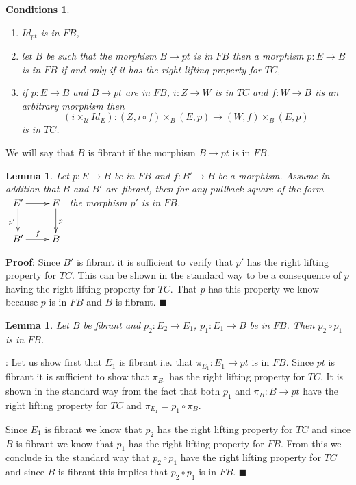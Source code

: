 \documentclass[12pt]{article}
\numberwithin{equation}{section}
\newenvironment{myproof}{{\bf Proof}:}{$\blacksquare$ \vskip 5mm }
\newtheorem{lemma}[proposition]{Lemma}
\newtheorem{cond}[proposition]{Conditions}
\newcommand{\llabel}[1]{\label{#1}}
\newcommand{\sr}{\rightarrow}
\newcommand{\U}{\mathcal{U}}
\begin{document}
%
\begin{cond}\llabel{2015.05.22.cond1}
%
\begin{enumerate}
\item $Id_{pt}$ is in $FB$,
\item let $B$ be such that the morphism $B\sr pt$ is in $FB$ then a morphism
  $p:E\sr B$ is in $FB$ if and only if it has the right lifting property for
  $TC$,
\item if $p:E\sr B$ and $B\sr pt$ are in $FB$, $i:Z\sr W$ is in $TC$ and
  $f:W\sr B$ iis an arbitrary morphism then
%
$$(i\times_\U Id_E):(Z,i\circ f)\times_B (E,p)\sr (W,f)\times_B (E,p)$$
%
is in $TC$.
%
\end{enumerate}
\end{cond}
%
We will say that $B$ is fibrant if the morphism $B\sr pt$ is in $FB$.
%
\begin{lemma}
\llabel{2015.05.14.l2} Let $p:E\sr B$ be in $FB$ and $f:B'\sr B$ be a
morphism. Assume in addition that $B$ and $B'$ are fibrant, then for any
pullback square of the form
%
$
\begin{xy}
          \xymatrix@C=2pc{ E' \ar[r] \ar[d]_{p'} & E \ar[d]^{p}\\ B'
            \ar[r]^-{f} & B }
\end{xy}
$
%
the morphism $p'$ is in $FB$.
\end{lemma}
%
\begin{myproof}
Since $B'$ is fibrant it is sufficient to verify that $p'$ has the right
lifting property for $TC$. This can be shown in the standard way to be a
consequence of $p$ having the right lifting property for $TC$. That $p$ has
this property we know because $p$ is in $FB$ and $B$ is fibrant.
\end{myproof}
%
\begin{lemma}
\llabel{2015.05.14.l4} Let $B$ be fibrant and $p_2:E_2\sr E_1$, $p_1:E_1\sr B$
be in $FB$. Then $p_2\circ p_1$ is in $FB$.
\end{lemma}
%
\begin{myproof}
Let us show first that $E_1$ is fibrant i.e. that $\pi_{E_1}:E_1\sr pt$ is in
$FB$. Since $pt$ is fibrant it is sufficient to show that $\pi_{E_1}$ has the
right lifting property for $TC$. It is shown in the standard way from the fact
that both $p_1$ and $\pi_B:B\sr pt$ have the right lifting property for $TC$
and $\pi_{E_1}=p_1\circ \pi_B$.

Since $E_1$ is fibrant we know that $p_2$ has the right lifting property for
$TC$ and since $B$ is fibrant we know that $p_1$ has the right lifting property
for $FB$. From this we conclude in the standard way that $p_2\circ p_1$ have
the right lifting property for $TC$ and since $B$ is fibrant this implies that
$p_2\circ p_1$ is in $FB$.
\end{myproof}
\end{document}
